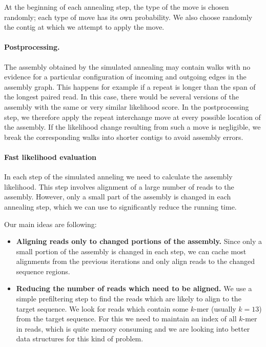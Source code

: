 At the beginning of each annealing step, the type of the move is
chosen randomly; each type of move has its own probability. We also
choose randomly the contig at which we attempt to apply the move. 


\paragraph{Postprocessing.}
The assembly obtained by the simulated annealing may contain walks
with no evidence for a particular configuration of incoming and
outgoing edges in the assembly graph. This happens for example if a
repeat is longer than the span of the longest paired read. In this
case, there would be several versions of the assembly with the same or
very similar likelihood score. 
In the postprocessing step, we therefore apply the repeat
interchange move at every possible location of the assembly. If the
likelihood change resulting from such a move is negligible, 
we break the corresponding walks into shorter contigs
to avoid assembly errors. 

\paragraph{Fast likelihood evaluation}
In each step of the simulated anneling we need to calculate
the assembly likelihood. This step involves
alignment of a large number of reads to the assembly.
However, only a small part of the assembly is changed in each
annealing step, which we can use to significantly reduce the running time.

Our main ideas are following:
\begin{itemize}
\item {\bf Aligning reads only to changed portions of the assembly.}
Since only a small portion of the assembly is changed in each step, 
we can cache most alignments from the previous iterations and only 
align reads to the changed sequence regions.
\item {\bf Reducing the number of reads which need to be aligned.}
We use a simple prefiltering step to
find the reads which are likely to align to the target sequence. 
We look for reads which 
contain some $k$-mer (usually $k=13$) from the target sequence.
For this we need to maintain an index of all $k$-mer in reads, which is
quite memory consuming and we are looking into better data structures for this kind
of problem.
\end{itemize}

